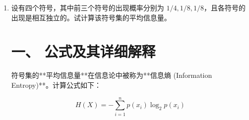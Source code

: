 \documentclass[a4paper,11pt]{ctexart}
\begin{document}
\begin{enumerate}[label=\textbf{1-\arabic*}]
        已知 $e$ 的出现概率 $p(e) = 0.105$。根据自信息公式：
        \begin{align*}
            I(e) &= -\log_2 p(e)              & (\text{引用公式}) \\
                &= -\log_2 (0.105)            & (\text{代入数值}) \\
                &= -\frac{\ln(0.105)}{\ln(2)} & (\text{换底公式计算}) \\
                &\approx -\frac{-2.25379}{0.69315} \\
                &\approx \mathbf{3.25 \text{ bit}}
        \end{align*}
        
        \textbf{2. 计算字母 $x$ 的信息量}
        
        已知 $x$ 的出现概率 $p(x) = 0.002$。根据自信息公式：
        \begin{align*}
            I(x) &= -\log_2 p(x)              & (\text{引用公式}) \\
                &= -\log_2 (0.002)            & (\text{代入数值}) \\
                &= -\frac{\ln(0.002)}{\ln(2)} & (\text{换底公式计算}) \\
                &\approx -\frac{-6.21461}{0.69315} \\
                &\approx \mathbf{8.97 \text{ bit}}
        \end{align*}
        
    \item 设有四个符号，其中前三个符号的出现概率分别为 $1/4, 1/8, 1/8$，且各符号的出现是相互独立的。试计算该符号集的平均信息量。
    
\begin{tcolorbox}[colback=white, colframe=blue!50!black, title=\textbf{题目解答：1-2 符号集平均信息量（信源熵）的计算}]

    \section*{一、 公式及其详细解释}
    
    符号集的**平均信息量**在信息论中被称为**信息熵 (Information Entropy)**。计算公式如下：
    
    \begin{equation}
        H(X) = -\sum_{i=1}^{n} p(x_i) \log_2 p(x_i)
    \end{equation}
    

\end{tcolorbox}
\end{enumerate}
\end{document}
